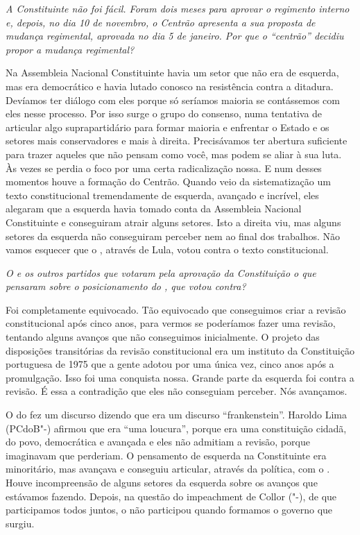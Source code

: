 \medskip

\noindent\emph{A Constituinte não foi fácil. Foram dois meses para aprovar o
regimento interno e, depois, no dia 10 de novembro, o Centrão apresenta
a sua proposta de mudança regimental, aprovada no dia 5 de janeiro. Por
que o ``centrão'' decidiu propor a mudança regimental?}

Na Assembleia Nacional Constituinte havia um setor que
não era de esquerda, mas era democrático e havia lutado conosco na
resistência contra a ditadura. Devíamos ter diálogo com eles porque só
seríamos maioria se contássemos com eles nesse processo. Por isso surge
o grupo do consenso, numa tentativa de articular algo suprapartidário
para formar maioria e enfrentar o Estado e os setores mais conservadores
e mais à direita. Precisávamos ter abertura suficiente para trazer
aqueles que não pensam como você, mas podem se aliar à sua luta. Às
vezes se perdia o foco por uma certa radicalização nossa. E num desses
momentos houve a formação do Centrão. Quando veio da sistematização um
texto constitucional tremendamente de esquerda, avançado e incrível,
eles alegaram que a esquerda havia tomado conta da Assembleia Nacional
Constituinte e conseguiram atrair alguns setores. Isto a direita viu,
mas alguns setores da esquerda não conseguiram perceber nem ao final dos
trabalhos. Não vamos esquecer que o , através de Lula, votou contra o
texto constitucional.

\medskip

\noindent\emph{O  e os outros partidos que votaram pela aprovação da
Constituição o que pensaram sobre o posicionamento do , que votou
contra?}

Foi completamente equivocado. Tão equivocado que
conseguimos criar a revisão constitucional após cinco anos, para vermos
se poderíamos fazer uma revisão, tentando alguns avanços que não
conseguimos inicialmente. O projeto das disposições transitórias da
revisão constitucional era um instituto da Constituição portuguesa de
1975 que a gente adotou por uma única vez, cinco anos após a
promulgação. Isso foi uma conquista nossa. Grande parte da esquerda foi
contra a revisão. É essa a contradição que eles não conseguiam perceber.
Nós avançamos.

O do fez um discurso dizendo que era um discurso ``frankenstein''.
Haroldo Lima (PCdoB"-) afirmou que era ``uma loucura'', porque era uma
constituição cidadã, do povo, democrática e avançada e eles não admitiam
a revisão, porque imaginavam que perderiam. O pensamento de esquerda na
Constituinte era minoritário, mas avançava e conseguiu articular,
através da política, com o . Houve incompreensão de alguns setores
da esquerda sobre os avanços que estávamos fazendo. Depois, na questão
do impeachment de Collor ("-), de que participamos todos juntos, o
 não participou quando formamos o governo que surgiu.

